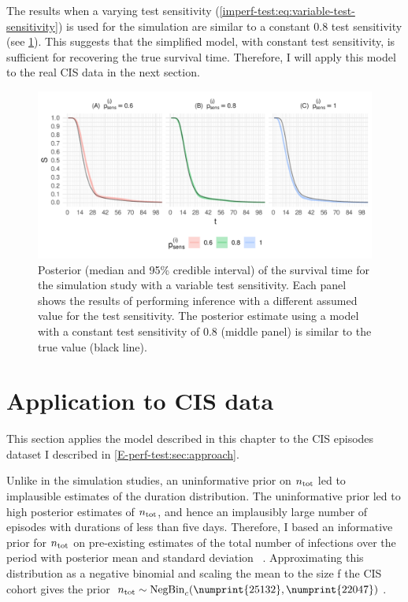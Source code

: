 \documentclass[thesis.tex]{subfiles}
\begin{document}
The results when a varying test sensitivity (\cref{imperf-test:eq:variable-test-sensitivity}) is used for the simulation are similar to a constant 0.8 test sensitivity (see \cref{imperf-test:fig:variable-test-sensitivity}).
This suggests that the simplified model, with constant test sensitivity, is sufficient for recovering the true survival time.
Therefore, I will apply this model to the real CIS data in the next section.
\begin{figure}
    \includegraphics[width=\textwidth]{cis-imperfect-testing/sim-variable-sensitivity}
  \caption[Simulation study results with varying test sensitivity]{%
    Posterior (median and 95\% credible interval) of the survival time for the simulation study with a variable test sensitivity.
    Each panel shows the results of performing inference with a different assumed value for the test sensitivity.
    The posterior estimate using a model with a constant test sensitivity of 0.8 (middle panel) is similar to the true value (black line).
  }
  \label{imperf-test:fig:variable-test-sensitivity}
\end{figure}

\section{Application to CIS data} \label{imperf-test:sec:application}

This section applies the model described in this chapter to the CIS episodes dataset I described in \cref{E-perf-test:sec:approach}.

Unlike in the simulation studies, an uninformative prior on $n_\text{tot}$ led to implausible estimates of the duration distribution.
The uninformative prior led to high posterior estimates of $n_\text{tot}$, and hence an implausibly large number of episodes with durations of less than five days.
Therefore, I based an informative prior for $n_\text{tot}$ on pre-existing estimates of the total number of infections over the period with posterior mean  and standard deviation ~\autocite{birrellRTM2}.
Approximating this distribution as a negative binomial and scaling the mean to the size f the CIS cohort gives the prior $\ntot \sim \NBc(\numprint{25132}, \numprint{22047})$.
\end{document}
